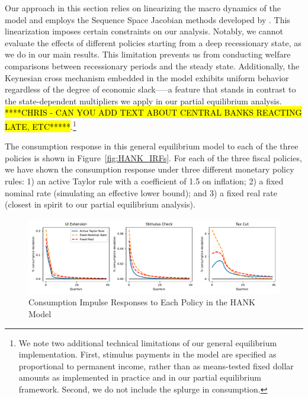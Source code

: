 \documentclass[\econtexRoot/HAFiscal]{subfiles}
\begin{document}
Our approach in this section relies on linearizing the macro dynamics of the model and employs the Sequence Space Jacobian methods developed by \cite{Auclert2021}. This linearization imposes certain constraints on our analysis. Notably, we cannot evaluate the effects of different policies starting from a deep recessionary state, as we do in our main results. This limitation prevents us from conducting welfare comparisons between recessionary periods and the steady state. Additionally, the Keynesian cross mechanism embedded in the model exhibits uniform behavior regardless of the degree of economic slack—--a feature that stands in contrast to the state-dependent multipliers we apply in our partial equilibrium analysis. \hl{****CHRIS - CAN YOU ADD TEXT ABOUT CENTRAL BANKS REACTING LATE, ETC*****}.\footnote{We note two additional technical limitations of our general equilibrium implementation. First, stimulus payments in the model are specified as proportional to permanent income, rather than as means-tested fixed dollar amounts as implemented in practice and in our partial equilibrium framework. Second, we do not include the splurge in consumption.}



The consumption response in this general equilibrium model to each of the three policies is shown in Figure~\ref{fig:HANK_IRFs}. For each of the three fiscal policies, we have shown the consumption response under three different monetary policy rules: 1) an active Taylor rule with a coefficient of 1.5 on inflation; 2) a fixed nominal rate (simulating an effective lower bound); and 3) a fixed real rate (closest in spirit to our partial equilibrium analysis).


\begin{figure}[th]
	\begin{center}
		\includegraphics[width=.9\textwidth]{../Figures/HANK_IRFs.pdf}
		\caption{Consumption Impulse Responses to Each Policy in the HANK Model}
		\notinsubfile{\label{fig:HANK_IRFs}}
	\end{center}
\end{figure}
\end{document}
